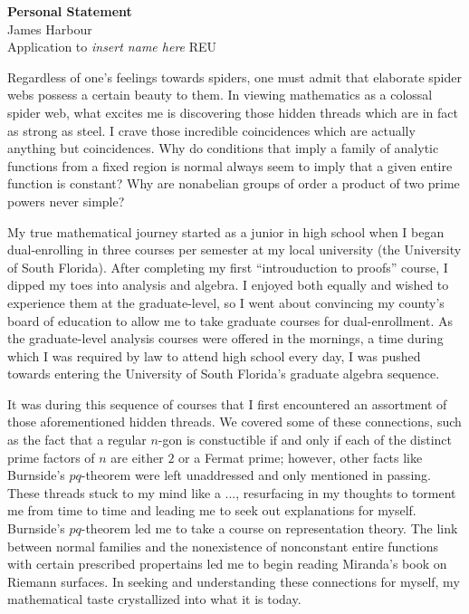 \documentclass[12pt]{article}
\begin{document}
\begin{center}
  \textbf{Personal Statement}\\
  James Harbour \\
  Application to \emph{insert name here} REU
\end{center}


Regardless of one's feelings towards spiders, one must admit that elaborate spider webs possess a certain beauty to them. In viewing mathematics as a colossal spider web, what excites me is discovering those hidden threads which are in fact as strong as steel. I crave those incredible coincidences which are actually anything but coincidences. Why do conditions that imply a family of analytic functions from a fixed region is normal always seem to imply that a given entire function is constant? Why are nonabelian groups of order a product of two prime powers never simple?








My true mathematical journey started as a junior in high school when I began dual-enrolling in three courses per semester at my local university (the University of South Florida). After completing my first ``introuduction to proofs'' course, I dipped my toes into analysis and algebra. I enjoyed both equally and wished to experience them at the graduate-level, so I went about convincing my county's board of education to allow me to take graduate courses for dual-enrollment. As the graduate-level analysis courses were offered in the mornings, a time during which I was required by law to attend high school every day, I was pushed towards entering the University of South Florida's graduate algebra sequence.

It was during this sequence of courses that I first encountered an assortment of those aforementioned hidden threads. We covered some of these connections, such as the fact that a regular $n$-gon is constuctible if and only if each of the distinct prime factors of $n$ are either $2$ or a Fermat prime; however, other facts like Burnside's $pq$-theorem were left unaddressed and only mentioned in passing. These threads stuck to my mind like a ..., resurfacing in my thoughts to torment me from time to time and leading me to seek out explanations for myself. Burnside's $pq$-theorem led me to take a course on representation theory. The link between normal families and the nonexistence of nonconstant entire functions with certain prescribed propertains led me to begin reading Miranda's book on Riemann surfaces. In seeking and understanding these connections for myself, my mathematical taste crystallized into what it is today.
\end{document}
